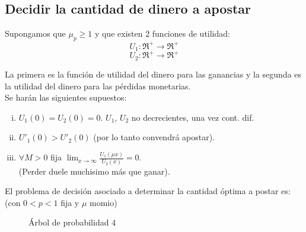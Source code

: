 \subsection{Decidir la cantidad de dinero a apostar}

Supongamos que $\mu_p \ge 1$ y que existen 2 funciones de utilidad:
\[U_1:\Re^+ \rightarrow \Re^+\]
\[U_2:\Re^+ \rightarrow \Re^+\]

La primera es la función de utilidad del dinero para las ganancias y la segunda es la utilidad del dinero para las pérdidas monetarias.\\

Se harán las siguientes supuestos:

\begin{enumerate}[(i)]
 \item $U_1(0)=U_2(0)=0$. $U_1$, $U_2$ no decrecientes, una vez cont. dif.
 \item $U'_1(0)>U'_2(0)$ (por lo tanto convendrá apostar).
 \item $\forall M>0$ fija $\displaystyle \lim_{x\rightarrow \infty} \frac{U_1(\mu x)}{U_2(x)}=0$.\\
 (Perder duele muchisimo más que ganar).
\end{enumerate}
El problema de decisión asociado a  determinar la cantidad óptima a postar es:(con $0<p<1$ fija y $\mu$ momio)\\

\begin{figure}[ht]
 \begin{center}
\end{center}
\caption{Árbol de probabilidad 4}
\end{figure}



